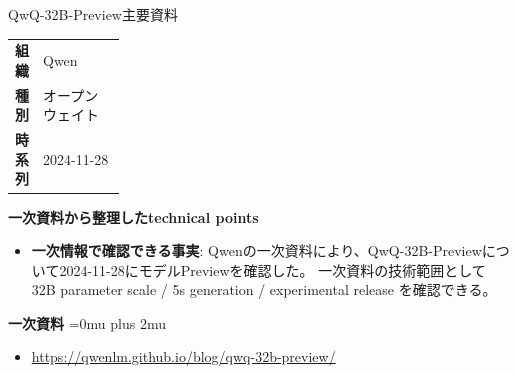 \begin{technicalnote}{QwQ-32B-Preview}{主要資料}
\begingroup
\begin{tabularx}{\linewidth}{@{}>{\bfseries}p{0.22\linewidth}X@{}}
組織 & Qwen \\
種別 & オープンウェイト \\
時系列 & 2024-11-28 \\
\end{tabularx}
\smallskip
{\bfseries 一次資料から整理したtechnical points}
\begin{itemize}[leftmargin=1.5em,itemsep=0.35em]
\item \textbf{一次情報で確認できる事実}: Qwenの一次資料により、QwQ-32B-Previewについて2024-11-28にモデルPreviewを確認した。 一次資料の技術範囲として 32B parameter scale / 5s generation / experimental release を確認できる。
\end{itemize}
\begin{minipage}{\linewidth}
\begin{samepage}
{\bfseries 一次資料}
\begingroup\sloppy
\Urlmuskip=0mu plus 2mu\relax
\begin{itemize}[leftmargin=1.5em,itemsep=0.25em]
\item {\scriptsize\url{https://qwenlm.github.io/blog/qwq-32b-preview/}}
\end{itemize}
\endgroup
\end{samepage}
\end{minipage}
\endgroup
\end{technicalnote}
\medskip

